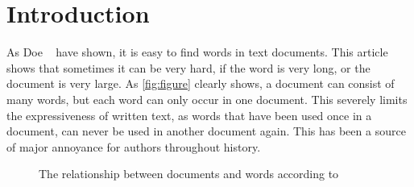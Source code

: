 \section{Introduction} %
\label{sec:introduction}
%
As Doe \etal~\cite{Doe1987} have shown, it is easy to find words in text
documents. This article shows that sometimes it can be very hard, if the word is
very long, or the document is very large. As \autoref{fig:figure} clearly shows,
a document can consist of many words, but each word can only occur in one
document. This severely limits the expressiveness of written text, as words that
have been used once in a document, can never be used in another document again.
This has been a source of major annoyance for authors throughout history.
%
\begin{figure}[tb]
    \centering
    
    \caption{The relationship between documents and words according to~\cite{Doe1987}}
    \label{fig:figure}
\end{figure}
%
